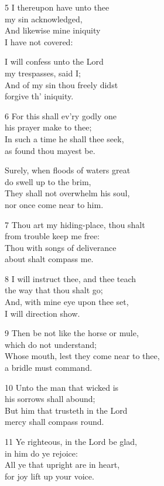 5 I thereupon have unto thee\\
my sin acknowledged,\\
And likewise mine iniquity\\
I have not covered:

I will confess unto the Lord\\
my trespasses, said I;\\
And of my sin thou freely didst\\
forgive th’ iniquity.

6 For this shall ev’ry godly one\\
his prayer make to thee;\\
In such a time he shall thee seek,\\
as found thou mayest be.

Surely, when floods of waters great\\
do swell up to the brim,\\
They shall not overwhelm his soul,\\
nor once come near to him.

7 Thou art my hiding-place, thou shalt\\
from trouble keep me free:\\
Thou with songs of deliverance\\
about shalt compass me.

8 I will instruct thee, and thee teach\\
the way that thou shalt go;\\
And, with mine eye upon thee set,\\
I will direction show.

9 Then be not like the horse or mule,\\
which do not understand;\\
Whose mouth, lest they come near to thee,\\
a bridle must command.

10 Unto the man that wicked is\\
his sorrows shall abound;\\
But him that trusteth in the Lord\\
mercy shall compass round.

11 Ye righteous, in the Lord be glad,\\
in him do ye rejoice:\\
All ye that upright are in heart,\\
for joy lift up your voice.

\begin{center}
\quad{}\quad{}
\end{center}

